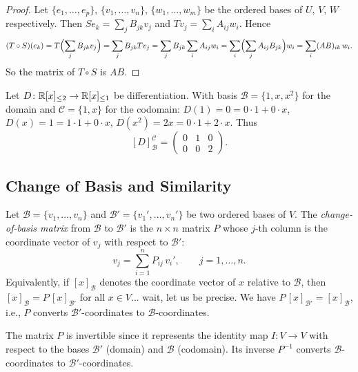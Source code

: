 \documentclass[11pt,a4paper]{article}
\begin{document}
\begin{proof}
Let $\{e_1, \ldots, e_p\}$, $\{v_1, \ldots, v_n\}$, $\{w_1, \ldots, w_m\}$ be
the ordered bases of $U$, $V$, $W$ respectively.  Then
$Se_k = \sum_j B_{jk} v_j$ and $Tv_j = \sum_i A_{ij} w_i$.  Hence
\[
  (T \circ S)(e_k)
  = T\Bigl(\sum_j B_{jk} v_j\Bigr)
  = \sum_j B_{jk} Tv_j
  = \sum_j B_{jk} \sum_i A_{ij} w_i
  = \sum_i \Bigl(\sum_j A_{ij} B_{jk}\Bigr) w_i
  = \sum_i (AB)_{ik}\, w_i.
\]
So the matrix of $T \circ S$ is $AB$.
\end{proof}

\begin{example}
\label{ex:matrix_diff}
Let $D\colon \mathbb{R}[x]_{\leq 2} \to \mathbb{R}[x]_{\leq 1}$ be differentiation.  With
basis $\mathcal{B} = \{1, x, x^2\}$ for the domain and
$\mathcal{C} = \{1, x\}$ for the codomain:
$D(1) = 0 = 0 \cdot 1 + 0 \cdot x$,\;
$D(x) = 1 = 1 \cdot 1 + 0 \cdot x$,\;
$D(x^2) = 2x = 0 \cdot 1 + 2 \cdot x$.
Thus
\[
  [D]_{\mathcal{B}}^{\mathcal{C}}
  = \begin{pmatrix} 0 & 1 & 0 \\ 0 & 0 & 2 \end{pmatrix}.
\]
\end{example}

\subsection{Change of Basis and Similarity}

\begin{definition}
\label{def:change_of_basis}
Let $\mathcal{B} = \{v_1, \ldots, v_n\}$ and
$\mathcal{B}' = \{v_1', \ldots, v_n'\}$ be two ordered bases of $V$.
The \emph{change-of-basis matrix} from $\mathcal{B}$ to $\mathcal{B}'$ is the
$n \times n$ matrix $P$ whose $j$-th column is the coordinate vector of $v_j$
with respect to $\mathcal{B}'$:
\[
  v_j = \sum_{i=1}^{n} P_{ij}\, v_i', \qquad j = 1, \ldots, n.
\]
Equivalently, if $[x]_{\mathcal{B}}$ denotes the coordinate vector of $x$
relative to $\mathcal{B}$, then $[x]_{\mathcal{B}} = P\,[x]_{\mathcal{B}'}$
for all $x \in V$... wait, let us be precise.  We have
$P\,[x]_{\mathcal{B}'} = [x]_{\mathcal{B}}$, i.e., $P$ converts
$\mathcal{B}'$-coordinates to $\mathcal{B}$-coordinates.
\end{definition}

\begin{remark}
The matrix $P$ is invertible since it represents the identity map
$I\colon V \to V$ with respect to the bases $\mathcal{B}'$ (domain) and
$\mathcal{B}$ (codomain).  Its inverse $P^{-1}$ converts
$\mathcal{B}$-coordinates to $\mathcal{B}'$-coordinates.
\end{remark}
\end{document}
